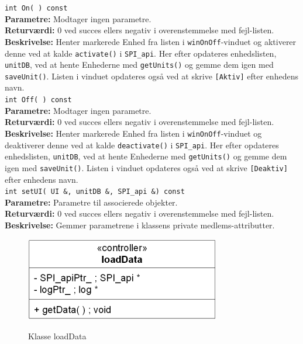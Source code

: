 \verb+int On( ) const+ \\
\textbf{Parametre:} Modtager ingen parametre. \\
\textbf{Returværdi:} 0 ved succes ellers negativ i overenstemmelse med fejl-listen. \\
\textbf{Beskrivelse:} Henter markerede Enhed fra listen i \verb+winOnOff+-vinduet og aktiverer denne ved at kalde \verb+activate()+ i \verb+SPI_api+. Her efter opdateres enhedslisten, \verb+unitDB+, ved at hente Enhederne med \verb+getUnits()+ og gemme dem igen med \verb+saveUnit()+. Listen i vinduet opdateres også ved at skrive \verb+[Aktiv]+ efter enhedens navn. \\

\verb+int Off( ) const+ \\
\textbf{Parametre:} Modtager ingen parametre. \\
\textbf{Returværdi:} 0 ved succes ellers negativ i overenstemmelse med fejl-listen. \\
\textbf{Beskrivelse:} Henter markerede Enhed fra listen i \verb+winOnOff+-vinduet og deaktiverer denne ved at kalde \verb+deactivate()+ i \verb+SPI_api+. Her efter opdateres enhedslisten, \verb+unitDB+, ved at hente Enhederne med \verb+getUnits()+ og gemme dem igen med \verb+saveUnit()+. Listen i vinduet opdateres også ved at skrive \verb+[Deaktiv]+ efter enhedens navn. \\

\verb+int setUI( UI &, unitDB &, SPI_api &) const+ \\
\textbf{Parametre:} Parametre til associerede objekter. \\
\textbf{Returværdi:} 0 ved succes ellers negativ i overenstemmelse med fejl-listen. \\
\textbf{Beskrivelse:} Gemmer parametrene i klassens private medlems-attributter. \\

\begin{figure}[htbp] \centering
{\includegraphics[scale=1.5]{filer/design/Klassediagrammer/sw_loadData}}
\caption{Klasse loadData}
\label{fig:loadData klassediagram}
\end{figure} 

